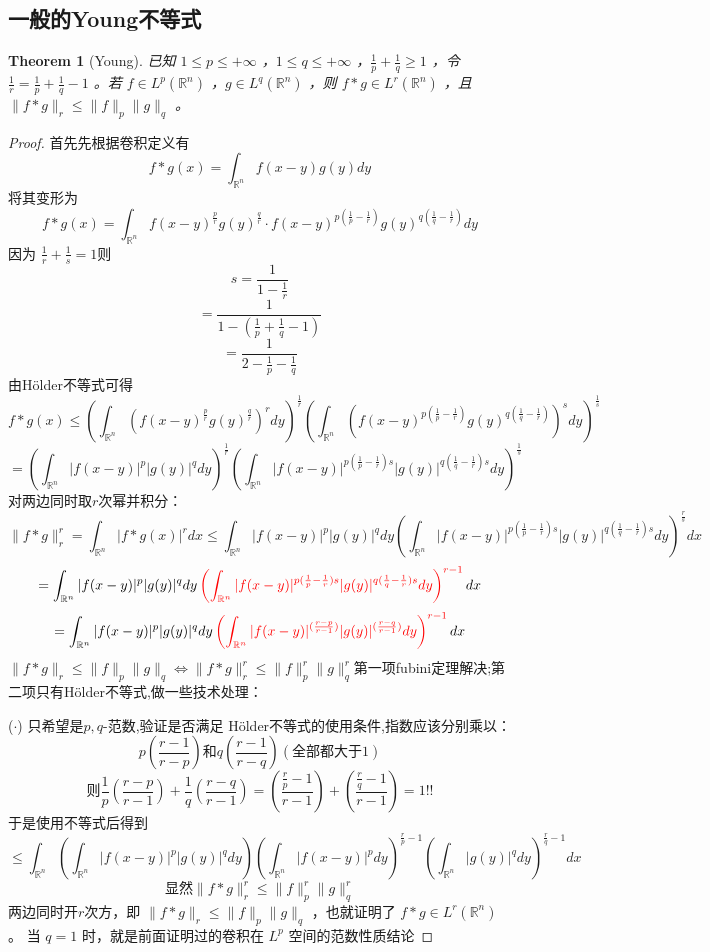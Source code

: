 \documentclass[linespread=1.5,openany]{book}%
\theoremstyle{plain}
\newtheorem{theorem}{Theorem}
\begin{document}
{{				\subsection{一般的Young不等式}
				\begin{theorem}[Young]
					已知 \(1\leq p\leq +\infty\) ，\(1\leq q\leq +\infty\) ，\(\frac{1}{p}+\frac{1}{q}\geq1\) ，令 \(\frac{1}{r}=\frac{1}{p}+\frac{1}{q}-1\) 。若 \(f\in L^p(\mathbb{R}^n)\) ，\(g\in L^q(\mathbb{R}^n)\) ，则 \(f * g\in L^r(\mathbb{R}^n)\) ，且 \(\|f * g\|_r\leq\|f\|_p\|g\|_q\) 。
				\end{theorem}
				\begin{proof}
					首先先根据卷积定义有
					\[
					f * g(x)=\int_{\mathbb{R}^n}f(x - y)g(y)dy
					\]
					将其变形为
					\[
					f * g(x)=\int_{\mathbb{R}^n}f(x - y)^{\frac{p}{r}}g(y)^{\frac{q}{r}}\cdot f(x - y)^{p(\frac{1}{p}-\frac{1}{r})}g(y)^{q(\frac{1}{q}-\frac{1}{r})}dy
					\]
					因为 \(\frac{1}{r}+\frac{1}{s}=1\text{则}\) 
					\[s=\frac{1}{1 - \frac{1}{r}}\]
					\[=\frac{1}{1 - (\frac{1}{p}+\frac{1}{q}-1)}\]
					\[=\frac{1}{2 - \frac{1}{p}-\frac{1}{q}}\]
					由Hölder不等式可得
					\[	f * g(x)\leq\left(\int_{\mathbb{R}^n}\left(f(x - y)^{\frac{p}{r}}g(y)^{\frac{q}{r}}\right)^r dy\right)^{\frac{1}{r}}\left(\int_{\mathbb{R}^n}\left(f(x - y)^{p(\frac{1}{p}-\frac{1}{r})}g(y)^{q(\frac{1}{q}-\frac{1}{r})}\right)^s dy\right)^{\frac{1}{s}}\]
					\[=\left(\int_{\mathbb{R}^n}|f(x - y)|^p|g(y)|^q dy\right)^{\frac{1}{r}}\left(\int_{\mathbb{R}^n}|f(x - y)|^{p(\frac{1}{p}-\frac{1}{r})s}|g(y)|^{q(\frac{1}{q}-\frac{1}{r})s} dy\right)^{\frac{1}{s}}\]
					对两边同时取\(r\)次幂并积分：
					\[
					\|f * g\|_r^r=\int_{\mathbb{R}^n}|f * g(x)|^r dx\leq \int_{\mathbb{R}^n}|f(x - y)|^p|g(y)|^q dy\left(\int_{\mathbb{R}^n}|f(x - y)|^{p(\frac{1}{p}-\frac{1}{r})s}|g(y)|^{q(\frac{1}{q}-\frac{1}{r})s} dy\right)^{\frac{r}{s}}dx\]
					\[=\int_{\mathbb{R}^n}|f(x - y)|^p|g(y)|^q dy\color{red}\left(\int_{\mathbb{R}^n}|f(x - y)|^{p(\frac{1}{p}-\frac{1}{r})s}|g(y)|^{q(\frac{1}{q}-\frac{1}{r})s} dy\right)^{r-1}\color{black}dx\]
					\[=\int_{\mathbb{R}^n}|f(x - y)|^p|g(y)|^q dy\color{red}\left(\int_{\mathbb{R}^n}|f(x - y)|^{(\frac{r-p}{r-1})}|g(y)|^{ (\frac{r-q}{r-1})} dy\right)^{r-1}\color{black}dx\]
					$\|f * g\|_r\leq\|f\|_p\|g\|_q\Leftrightarrow\|f * g\|_r^r\leq\|f\|_p^r\|g\|_q^r$第一项fubini定理解决;第二项只有H\"{o}lder不等式,做一些技术处理：
					
					\item[($\cdot$)]只希望是$p,q$-范数,验证是否满足 H\"{o}lder不等式的使用条件,指数应该分别乘以：\[p(\frac{r-1}{r-p})\text{和}q(\frac{r-1}{r-q})(\text{全部都大于}1)\]
					\[\text{则}\frac{1}{p}(\frac{r-p}{r-1})+\frac{1}{q}(\frac{r-q}{r-1})=(\frac{\frac{r}{p}-1}{r-1})+(\frac{\frac{r}{q}-1}{r-1})=1\textbf{!!}
					\]
					于是使用不等式后得到
					\[\leq\int_{\mathbb{R}^n}\left(\int_{\mathbb{R}^n}|f(x - y)|^p|g(y)|^q dy\right) (\int_{\mathbb{R}^n} |f(x-y)|^pdy)^{\frac{r}{p}-1}(\int_{\mathbb{R}^n} |g(y)|^qdy)^{\frac{r}{q}-1}dx\]
					\[\text{显然}
					\|f * g\|_r^r\leq\|f\|_p^r\|g\|_q^r
					\]
					两边同时开\(r\)次方，即 \(\|f * g\|_r\leq\|f\|_p\|g\|_q\) ，也就证明了 \(f * g\in L^r(\mathbb{R}^n)\) 。
					当 \(q = 1\) 时，就是前面证明过的卷积在 \(L^p\) 空间的范数性质结论
				\end{proof}
			}
}
\end{document}
